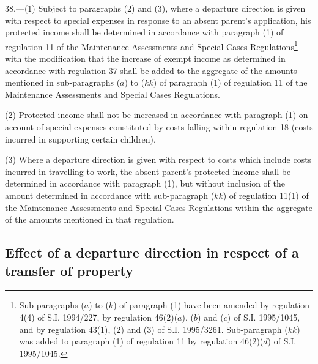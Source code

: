 \documentclass[a4paper]{article}
\begin{document}
38.—(1) Subject to paragraphs (2) and (3), where a departure direction is
given with respect to special expenses in response to an absent parent’s
application, his protected income shall be determined in accordance with
paragraph (1) of regulation 11 of the Maintenance Assessments and Special Cases
Regulations\footnote{\frenchspacing Sub-paragraphs ($a$) to ($k$) of paragraph (1) have been amended by regulation 4(4) of S.I. 1994/227, by regulation 46(2)($a$), ($b$) and ($c$) of S.I. 1995/1045, and by regulation 43(1), (2) and (3) of S.I. 1995/3261. Sub-paragraph ($kk$) was added to paragraph (1) of regulation 11 by regulation 46(2)($d$) of S.I. 1995/1045.} with the modification that the increase of exempt income as
determined in accordance with regulation 37 shall be added to the aggregate of
the amounts mentioned in sub-paragraphs ($a$) to ($kk$) of paragraph (1) of
regulation 11 of the Maintenance Assessments and Special Cases Regulations.

(2) Protected income shall not be increased in accordance with paragraph (1) on
account of special expenses constituted by costs falling within regulation 18
(costs incurred in supporting certain children).

(3) Where a departure direction is given with respect to costs which include
costs incurred in travelling to work, the absent parent’s protected income shall
be determined in accordance with paragraph (1), but without inclusion of the
amount determined in accordance with sub-paragraph ($kk$) of regulation 11(1) of
the Maintenance Assessments and Special Cases Regulations within the aggregate
of the amounts mentioned in that regulation.

\subsection[39. Effect of a departure direction in respect of a transfer of property]{Effect of a departure direction in respect of a transfer of property}
\end{document}
